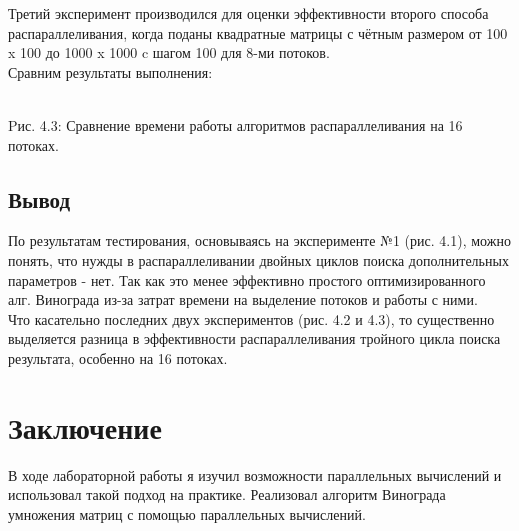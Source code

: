 \documentclass[12pt]{report}
\begin{document}
Третий эксперимент производился для оценки эффективности второго способа распараллеливания, когда поданы квадратные матрицы с чётным размером от 100 x 100 до 1000 x 1000 c шагом 100 для 8-ми потоков.\\
Сравним результаты выполнения:\\
\\
\begin{center}
	Pис. 4.3: Сравнение времени работы алгоритмов распараллеливания на 16 потоках.
\end{center}


\section{Вывод}
По результатам тестирования, основываясь на эксперименте №1 (рис. 4.1), можно понять, что нужды в распараллеливании двойных циклов поиска дополнительных параметров - нет. Так как это менее эффективно простого оптимизированного алг. Винограда из-за затрат времени на выделение потоков и работы с ними.\\
Что касательно последних двух экспериментов (рис. 4.2 и 4.3), то существенно выделяется разница в эффективности распараллеливания тройного цикла поиска результата, особенно на 16 потоках. 

\chapter*{Заключение}
В ходе лабораторной работы я изучил возможности параллельных вычислений и использовал такой подход на практике. Реализовал алгоритм Винограда умножения матриц с помощью параллельных вычислений.
\end{document}
